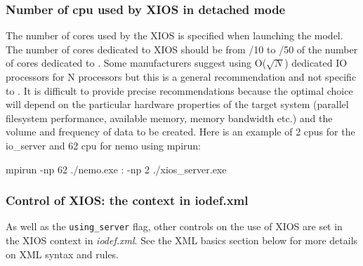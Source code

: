 \documentclass[../main/NEMO_manual]{subfiles}
\begin{document}
\subsubsection{Number of cpu used by XIOS in detached mode}

The number of cores used by the XIOS is specified when launching the model.  The number of
cores dedicated to XIOS should be from /10 to /50 of the
number of cores dedicated to \NEMO.  Some manufacturers suggest using O($\sqrt{N}$)
dedicated IO processors for N processors but this is a general recommendation and not
specific to \NEMO.  It is difficult to provide precise recommendations because the optimal
choice will depend on the particular hardware properties of the target system (parallel
filesystem performance, available memory, memory bandwidth etc.) and the volume and
frequency of data to be created.  Here is an example of 2 cpus for the io\_server and 62
cpu for nemo using mpirun:

\begin{cmds}
  mpirun -np 62 ./nemo.exe : -np 2 ./xios_server.exe
\end{cmds}

\subsubsection{Control of XIOS: the context in iodef.xml}

As well as the \texttt{using\_server} flag, other controls on the use of XIOS are set in
the XIOS context in \textit{iodef.xml}.
See the XML basics section below for more details on XML syntax and rules.
\end{document}

